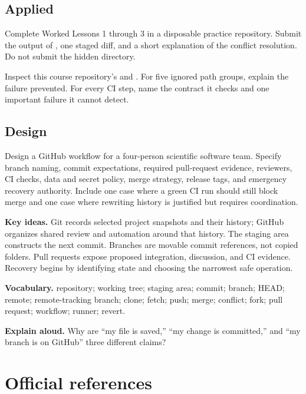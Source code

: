 \subsection*{Applied}

Complete Worked Lessons 1 through 3 in a disposable practice repository. Submit
the output of , one staged diff,
and a short explanation of the conflict resolution. Do not submit the hidden
 directory.

Inspect this course repository's  and
. For five ignored path groups, explain
the failure prevented. For every CI step, name the contract it checks and one
important failure it cannot detect.

\subsection*{Design}

Design a GitHub workflow for a four-person scientific software team. Specify
branch naming, commit expectations, required pull-request evidence, reviewers,
CI checks, data and secret policy, merge strategy, release tags, and emergency
recovery authority. Include one case where a green CI run should still block
merge and one case where rewriting history is justified but requires
coordination.

\begin{chapterreview}
\textbf{Key ideas.} Git records selected project snapshots and their history;
GitHub organizes shared review and automation around that history. The staging
area constructs the next commit. Branches are movable commit references, not
copied folders. Pull requests expose proposed integration, discussion, and CI
evidence. Recovery begins by identifying state and choosing the narrowest safe
operation.

\textbf{Vocabulary.} repository; working tree; staging area; commit; branch;
HEAD; remote; remote-tracking branch; clone; fetch; push; merge; conflict; fork;
pull request; workflow; runner; revert.

\textbf{Explain aloud.} Why are ``my file is saved,'' ``my change is committed,''
and ``my branch is on GitHub'' three different claims?
\end{chapterreview}

\section{Official references}

